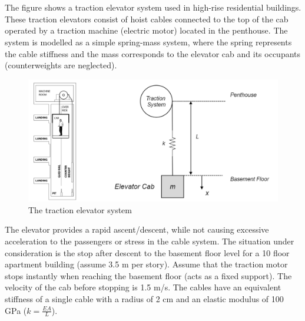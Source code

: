 \section{}
The figure shows a traction elevator system used in high-rise residential buildings. These traction 
elevators consist of hoist cables connected to the top of the cab operated by a traction machine 
(electric motor) located in the penthouse. The system is modelled as a simple spring-mass system, 
where the spring represents the cable stiffness and the mass corresponds to the elevator cab and its 
occupants (counterweights are neglected).
\begin{figure}[h]
    \centering
    \includegraphics[width=0.5\linewidth]{Questions/Figures/q4 problem diagram.png}
    \caption{The traction elevator system}
    \label{fig:q4-png}
\end{figure}
The elevator provides a rapid ascent/descent, while not causing excessive acceleration to the
passengers or stress in the cable system. The situation under consideration is the stop after descent
to the basement floor level for a 10 floor apartment building (assume 3.5 m per story). Assume
that the traction motor stops instantly when reaching the basement floor (acts as a fixed support).
The velocity of the cab before stopping is 1.5 m/s. The cables have an equivalent stiffness of a
single cable with a radius of 2 cm and an elastic modulus of 100 GPa ($k = \frac{EA}{L}$).

